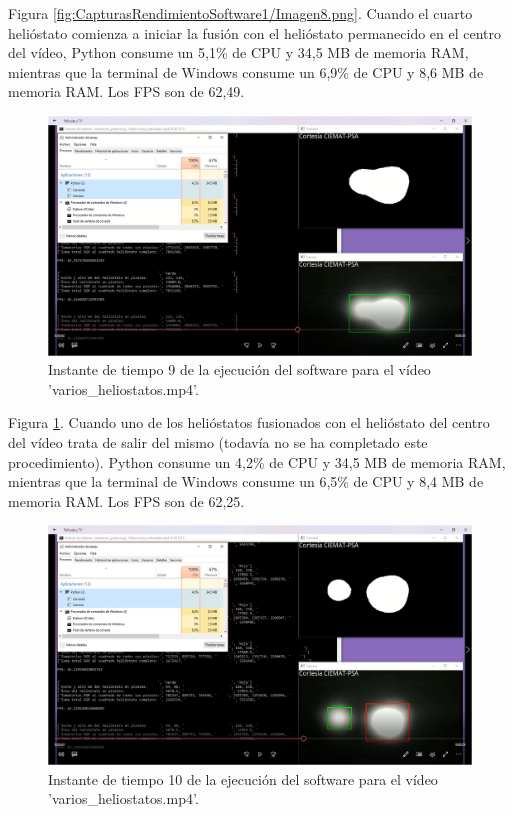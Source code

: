 Figura \ref{fig:CapturasRendimientoSoftware1/Imagen8.png}. Cuando el cuarto helióstato comienza a iniciar la fusión con el helióstato permanecido en el centro del vídeo, Python consume un 5,1\% de CPU y 34,5 MB de memoria RAM, mientras que la terminal de Windows consume un 6,9\% de CPU y 8,6 MB de memoria RAM. Los FPS son de 62,49.\\[20pt]

\begin{figure}[h!]
  	\centering
	\includegraphics[width=\textwidth]{CapturasRendimientoSoftware1/Imagen9.png}
	\caption{Instante de tiempo 9 de la ejecución del software para el vídeo 'varios\_heliostatos.mp4'.
	\label{fig:CapturasRendimientoSoftware1/Imagen9.png}}
\end{figure}

Figura \ref{fig:CapturasRendimientoSoftware1/Imagen9.png}. Cuando uno de los helióstatos fusionados con el helióstato del centro del vídeo trata de salir del mismo (todavía no se ha completado este procedimiento). Python consume un 4,2\% de CPU y 34,5 MB de memoria RAM, mientras que la terminal de Windows consume un 6,5\% de CPU y 8,4 MB de memoria RAM. Los FPS son de 62,25.\\[20pt]

\begin{figure}[h!]
  	\centering
	\includegraphics[width=\textwidth]{CapturasRendimientoSoftware1/Imagen10.png}
	\caption{Instante de tiempo 10 de la ejecución del software para el vídeo 'varios\_heliostatos.mp4'.
	\label{fig:CapturasRendimientoSoftware1/Imagen10.png}}
\end{figure}

